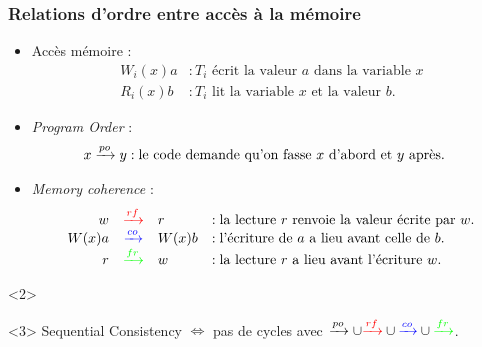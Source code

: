 \documentclass[xcolor={x11names,svgnames}]{beamer}
\begin{document}
\begin{frame}[label=peterson]
  \frametitle{Relations d'ordre entre accès à la mémoire}
  
  \setlength{\leftmargini}{-2mm}
  \begin{itemize}
    \item Accès mémoire :  
      \begin{align*}
        W_i(x)a &: \text{$T_i$ écrit la valeur $a$ dans la variable $x$} \\
        R_i(x)b &: \text{$T_i$ lit la variable $x$ et la valeur $b$.}
      \end{align*}

    \item \og \emph{Program Order}\fg{} :
      \begin{align*}
        x \xrightarrow{po} y &: \text{le code demande qu'on fasse $x$ d'abord et $y$ après.}
      \end{align*}

    \item \og \emph{Memory coherence}\fg{} :
      \[
      \begin{array}{rcll}
        w &{\color{red}\xrightarrow{rf}} &r &: \text{la lecture $r$ renvoie la valeur écrite par $w$.}\\
        W(x)a &{\color{blue}\xrightarrow{co}}& W(x)b &: \text{l'écriture de $a$ a lieu avant celle de $b$.}\\
        r &{\color{green}\xrightarrow{fr}}& w &: \text{la lecture $r$ a lieu avant l'écriture $w$.}
      \end{array}
    \]
  \end{itemize}
    \begin{overlayarea}{\textwidth}{2.5cm}
\begin{onlyenv}<2>   
\begin{center}
\end{center}
\end{onlyenv}

\begin{theorem}<3>
  Sequential Consistency $\Longleftrightarrow$ pas de cycles avec $\xrightarrow{po} \cup {\color{red}\xrightarrow{rf}} \cup {\color{blue}\xrightarrow{co}} \cup {\color{green}\xrightarrow{fr}}$.
\end{theorem}
\end{overlayarea}
\end{frame}
\end{document}
